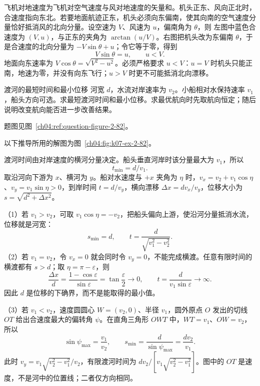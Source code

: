 {\begin{xesolution}
飞机对地速度为飞机对空气速度与风对地速度的矢量和。机头正东、风向正北时，合速度指向东北。若要地面航迹正东，机头必须向东偏南，使其向南的空气速度分量恰好抵消风的北向分量。设空速为 $V$、风速为 $u$，偏南角为 $\theta$，则
\AircraftWindDiagram
左图中蓝色合速度为 $(V,u)$，与正东的夹角为 $\arctan(u/V)$。右图把机头改为东偏南 $\theta$，于是合速度的北向分量为 $-V\sin\theta+u$；令它等于零，得到
\[
\boxed{V\sin\theta=u},\qquad u<V.
\]
地面向东速率为 $V\cos\theta=\sqrt{V^2-u^2}$。必须严格要求 $u<V$：$u=V$ 时机头只能正南，地速为零，并没有向东飞行；$u>V$ 时更不可能抵消北向漂移。
\end{xesolution}


\begin{origexamplebox}{渡河的最短时间和最小位移}\label{ch04:ex:k07-2-82}
河宽 $d$，水流对岸速率为 $v_2$。小船相对水保持速率 $v_1$，船头方向可选。求最短渡河时间和最小位移。求最优航向时先取航向恒定；随后说明改变航向能否进一步改善结果。
\par 题图见图~\ref{ch04:ref:question-figure-2-82}。
\KQuestionDE
\end{origexamplebox}
\begin{xesolution}
以下推导所用的解图为图~\ref{ch04:fig:k07-ex-2-82}。

渡河时间由对岸速度的横河分量决定。船头垂直河岸时该分量最大为 $v_1$，所以
\RiverCrossingDiagram
\[
\boxed{t_{\min}=d/v_1}.
\]
取沿河向下游为 $x$、横河为 $y$。船对水速度与 $+x$ 夹角为 $\eta$ 时，$v_x=v_2+v_1\cos\eta$、$v_y=v_1\sin\eta>0$，到岸时间 $t=d/v_y$，横向漂移 $\Delta x=dv_x/v_y$，位移大小为 $s=\sqrt{d^2+\Delta x^2}$。

（1）若 $v_1>v_2$，可取 $v_1\cos\eta=-v_2$，把船头偏向上游，使沿河分量抵消水流，位移就是河宽：
\[
\boxed{s_{\min}=d},\qquad
t=\frac{d}{\sqrt{v_1^2-v_2^2}}.
\]
（2）若 $v_1=v_2$，令 $v_x=0$ 就会同时令 $v_y=0$，不能完成横渡。任意有限时间的横渡都有 $s>d$；取 $\eta=\pi-\varepsilon$，则
\[
\frac{\Delta x}{d}=\frac{1-\cos\varepsilon}{\sin\varepsilon}
=\tan\frac\varepsilon2\longrightarrow0,
\qquad t=\frac{d}{v_1\sin\varepsilon}\longrightarrow\infty.
\]
因此 $d$ 是位移的下确界，而不是能取得的最小值。

（3）若 $v_1<v_2$，速度圆圆心 $W=(v_2,0)$、半径 $v_1$，圆外原点 $O$ 发出的切线 $OT$ 给出合速度最大的偏转角 $\psi$。在直角三角形 $OWT$ 中，$WT=v_1$、$OW=v_2$，所以
\[
\sin\psi_{\max}=\frac{v_1}{v_2},\qquad
\boxed{s_{\min}=\frac{d}{\sin\psi_{\max}}=\frac{dv_2}{v_1}}.
\]
此时 $v_y=v_1\sqrt{v_2^2-v_1^2}/v_2$，有限渡河时间为 $dv_2/[v_1\sqrt{v_2^2-v_1^2}]$。图中的 $OT$ 是速度，不是河中的位置线；二者仅方向相同。


\end{xesolution}}
